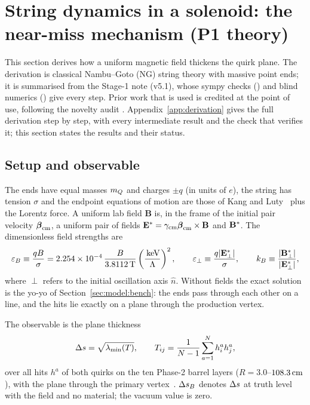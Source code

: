 \section{String dynamics in a solenoid: the near-miss mechanism (P1 theory)}\label{sec:string}

This section derives how a uniform magnetic field thickens the quirk plane. The derivation is classical Nambu--Goto (NG)
string theory with massive point ends; it is summarised from the Stage-1 note 
(v5.1), whose sympy checks () and blind numerics () give every
step. Prior work that is used is credited at the point of use, following the novelty audit
. Appendix~\ref{app:derivation} gives the full derivation step by step, with every intermediate result and the
check that verifies it; this section states the results and their status.

\subsection{Setup and observable}\label{sec:string:setup}
The ends have equal masses $m_Q$ and charges $\pm q$ (in units of $e$), the string has tension $\sigma$ and the endpoint
equations of motion are those of Kang and Luty~\cite{Kang:2008ea} plus the Lorentz force. A uniform lab field
$\mathbf B$ is, in the frame of the initial pair velocity $\boldsymbol\beta_{\rm cm}$, a uniform pair of fields
$\mathbf{E}^*=\gamma_{\rm cm}\boldsymbol\beta_{\rm cm}\times\mathbf B$ and $\mathbf{B}^*$. The dimensionless field strengths are
\begin{equation}
  \varepsilon_B\equiv\frac{qB}{\sigma}=2.254\times10^{-4}\,\frac{B}{3.8112\,\mathrm{T}}\left(\frac{\,\mathrm{keV}}{\Lambda}\right)^2,\qquad
  \varepsilon_\perp\equiv\frac{q|\mathbf{E}^*_\perp|}{\sigma},\qquad k_B\equiv\frac{|\mathbf{B}^*_\perp|}{|\mathbf{E}^*_\perp|},
  \label{eq:eps}
\end{equation}
where $\perp$ refers to the initial oscillation axis $\hat n$. Without fields the exact solution is the yo-yo of
Section~\ref{sec:model:bench}: the ends pass through each other on a line, and the hits lie exactly on a plane through
the production vertex.

The observable is the plane thickness
\begin{equation}
  \Delta s=\sqrt{\lambda_{\min}(T)},\qquad T_{ij}=\frac{1}{N-1}\sum_{a=1}^{N}h^a_i h^a_j ,
  \label{eq:ds}
\end{equation}
over all hits $h^a$ of both quirks on the ten Phase-2 barrel layers ($R=3.0$--$108.3\,\mathrm{cm}$), with the plane through the
primary vertex~\cite{Knapen:2017kly,Li:2020aoq}. $\Delta s_B$ denotes $\Delta s$ at truth level with the field and no material;
the vacuum value is zero.

